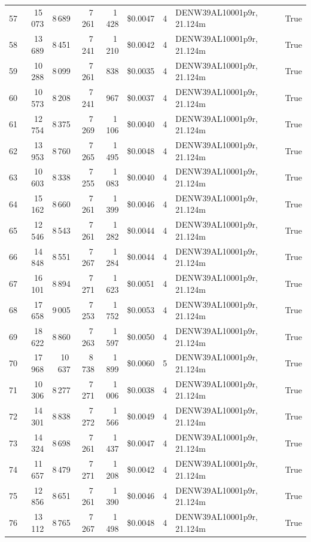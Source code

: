 \documentclass[a4paper,11pt]{article}
\begin{document}
\begin{table}[ht]
\begin{tabular}{r r r r r r r p{3cm} l}
57 & 15\,073 & 8\,689 & 7\,261 & 1\,428 & \$0.0047 & 4 & DENW39AL10001p9r, 21.124m & True \\
58 & 13\,689 & 8\,451 & 7\,241 & 1\,210 & \$0.0042 & 4 & DENW39AL10001p9r, 21.124m & True \\
59 & 10\,288 & 8\,099 & 7\,261 & 838 & \$0.0035 & 4 & DENW39AL10001p9r, 21.124m & True \\
60 & 10\,573 & 8\,208 & 7\,241 & 967 & \$0.0037 & 4 & DENW39AL10001p9r, 21.124m & True \\
61 & 12\,754 & 8\,375 & 7\,269 & 1\,106 & \$0.0040 & 4 & DENW39AL10001p9r, 21.124m & True \\
62 & 13\,953 & 8\,760 & 7\,265 & 1\,495 & \$0.0048 & 4 & DENW39AL10001p9r, 21.124m & True \\
63 & 10\,603 & 8\,338 & 7\,255 & 1\,083 & \$0.0040 & 4 & DENW39AL10001p9r, 21.124m & True \\
64 & 15\,162 & 8\,660 & 7\,261 & 1\,399 & \$0.0046 & 4 & DENW39AL10001p9r, 21.124m & True \\
65 & 12\,546 & 8\,543 & 7\,261 & 1\,282 & \$0.0044 & 4 & DENW39AL10001p9r, 21.124m & True \\
66 & 14\,848 & 8\,551 & 7\,267 & 1\,284 & \$0.0044 & 4 & DENW39AL10001p9r, 21.124m & True \\
67 & 16\,101 & 8\,894 & 7\,271 & 1\,623 & \$0.0051 & 4 & DENW39AL10001p9r, 21.124m & True \\
68 & 17\,658 & 9\,005 & 7\,253 & 1\,752 & \$0.0053 & 4 & DENW39AL10001p9r, 21.124m & True \\
69 & 18\,622 & 8\,860 & 7\,263 & 1\,597 & \$0.0050 & 4 & DENW39AL10001p9r, 21.124m & True \\
70 & 17\,968 & 10\,637 & 8\,738 & 1\,899 & \$0.0060 & 5 & DENW39AL10001p9r, 21.124m & True \\
71 & 10\,306 & 8\,277 & 7\,271 & 1\,006 & \$0.0038 & 4 & DENW39AL10001p9r, 21.124m & True \\
72 & 14\,301 & 8\,838 & 7\,272 & 1\,566 & \$0.0049 & 4 & DENW39AL10001p9r, 21.124m & True \\
73 & 14\,324 & 8\,698 & 7\,261 & 1\,437 & \$0.0047 & 4 & DENW39AL10001p9r, 21.124m & True \\
74 & 11\,657 & 8\,479 & 7\,271 & 1\,208 & \$0.0042 & 4 & DENW39AL10001p9r, 21.124m & True \\
75 & 12\,856 & 8\,651 & 7\,261 & 1\,390 & \$0.0046 & 4 & DENW39AL10001p9r, 21.124m & True \\
76 & 13\,112 & 8\,765 & 7\,267 & 1\,498 & \$0.0048 & 4 & DENW39AL10001p9r, 21.124m & True \\

\end{tabular}
\end{table}
\end{document}
